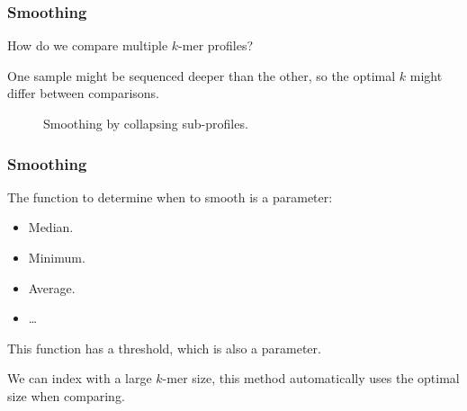 \documentclass[slidestop]{beamer}
\begin{document}
\begin{frame}
  \frametitle{Smoothing}

  How do we compare multiple $k$-mer profiles?
  \medskip

  One sample might be sequenced deeper than the other, so the optimal $k$ might
  differ between comparisons.
  \pause

  \begin{figure}
    \caption{Smoothing by collapsing sub-profiles.}
  \end{figure}
\end{frame}

\begin{frame}
  \frametitle{Smoothing}

  The function to determine when to smooth is a parameter:

  \begin{itemize}
    \item Median.
    \item Minimum.
    \item Average.
    \item \ldots
  \end{itemize}
  \bigskip

  This function has a threshold, which is also a parameter.
  \bigskip
  \pause

  We can index with a large $k$-mer size, this method automatically uses the
  optimal size when comparing.
\end{frame}
\end{document}
